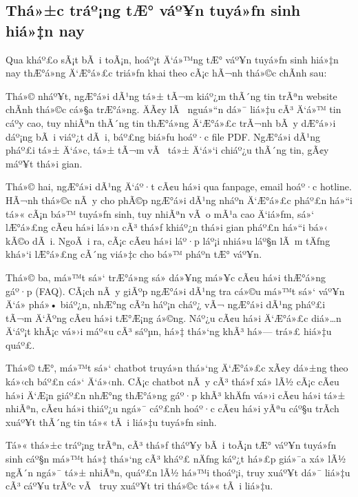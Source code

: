 ﻿\documentclass[12pt,a4paper]{report}
\begin{document}
\subsection{Thá»±c tráº¡ng tÆ° váº¥n tuyá»ƒn sinh hiá»‡n nay}

Qua kháº£o sÃ¡t bÃ i toÃ¡n, hoáº¡t Ä‘á»™ng tÆ° váº¥n tuyá»ƒn sinh hiá»‡n nay thÆ°á»ng Ä‘Æ°á»£c triá»ƒn khai theo cÃ¡c hÃ¬nh thá»©c chÃ­nh sau:

Thá»© nháº¥t, ngÆ°á»i dÃ¹ng tá»± tÃ¬m kiáº¿m thÃ´ng tin trÃªn website chÃ­nh thá»©c cá»§a trÆ°á»ng. ÄÃ¢y lÃ  nguá»“n dá»¯ liá»‡u cÃ³ Ä‘á»™ tin cáº­y cao, tuy nhiÃªn thÃ´ng tin thÆ°á»ng Ä‘Æ°á»£c trÃ¬nh bÃ y dÆ°á»›i dáº¡ng bÃ i viáº¿t dÃ i, báº£ng biá»ƒu hoáº·c file PDF. NgÆ°á»i dÃ¹ng pháº£i tá»± Ä‘á»c, tá»± tÃ¬m vÃ  tá»± Ä‘á»‘i chiáº¿u thÃ´ng tin, gÃ¢y máº¥t thá»i gian.

Thá»© hai, ngÆ°á»i dÃ¹ng Ä‘áº·t cÃ¢u há»i qua fanpage, email hoáº·c hotline. HÃ¬nh thá»©c nÃ y cho phÃ©p ngÆ°á»i dÃ¹ng nháº­n Ä‘Æ°á»£c pháº£n há»“i tá»« cÃ¡n bá»™ tuyá»ƒn sinh, tuy nhiÃªn vÃ o mÃ¹a cao Ä‘iá»ƒm, sá»‘ lÆ°á»£ng cÃ¢u há»i lá»›n cÃ³ thá»ƒ khiáº¿n thá»i gian pháº£n há»“i bá»‹ kÃ©o dÃ i. NgoÃ i ra, cÃ¡c cÃ¢u há»i láº·p láº¡i nhiá»u láº§n lÃ m tÄƒng khá»‘i lÆ°á»£ng cÃ´ng viá»‡c cho bá»™ pháº­n tÆ° váº¥n.

Thá»© ba, má»™t sá»‘ trÆ°á»ng sá»­ dá»¥ng má»¥c cÃ¢u há»i thÆ°á»ng gáº·p (FAQ). CÃ¡ch nÃ y giÃºp ngÆ°á»i dÃ¹ng tra cá»©u má»™t sá»‘ váº¥n Ä‘á» phá»• biáº¿n, nhÆ°ng cÃ²n háº¡n cháº¿ vÃ¬ ngÆ°á»i dÃ¹ng pháº£i tÃ¬m Ä‘Ãºng cÃ¢u há»i tÆ°Æ¡ng á»©ng. Náº¿u cÃ¢u há»i Ä‘Æ°á»£c diá»…n Ä‘áº¡t khÃ¡c vá»›i máº«u cÃ³ sáºµn, há»‡ thá»‘ng khÃ³ há»— trá»£ hiá»‡u quáº£.

Thá»© tÆ°, má»™t sá»‘ chatbot truyá»n thá»‘ng Ä‘Æ°á»£c xÃ¢y dá»±ng theo ká»‹ch báº£n cá»‘ Ä‘á»‹nh. CÃ¡c chatbot nÃ y cÃ³ thá»ƒ xá»­ lÃ½ cÃ¡c cÃ¢u há»i Ä‘Æ¡n giáº£n nhÆ°ng thÆ°á»ng gáº·p khÃ³ khÄƒn vá»›i cÃ¢u há»i tá»± nhiÃªn, cÃ¢u há»i thiáº¿u ngá»¯ cáº£nh hoáº·c cÃ¢u há»i yÃªu cáº§u trÃ­ch xuáº¥t thÃ´ng tin tá»« tÃ i liá»‡u tuyá»ƒn sinh.

Tá»« thá»±c tráº¡ng trÃªn, cÃ³ thá»ƒ tháº¥y bÃ i toÃ¡n tÆ° váº¥n tuyá»ƒn sinh cáº§n má»™t há»‡ thá»‘ng cÃ³ kháº£ nÄƒng káº¿t há»£p giá»¯a xá»­ lÃ½ ngÃ´n ngá»¯ tá»± nhiÃªn, quáº£n lÃ½ há»™i thoáº¡i, truy xuáº¥t dá»¯ liá»‡u cÃ³ cáº¥u trÃºc vÃ  truy xuáº¥t tri thá»©c tá»« tÃ i liá»‡u.
\end{document}
